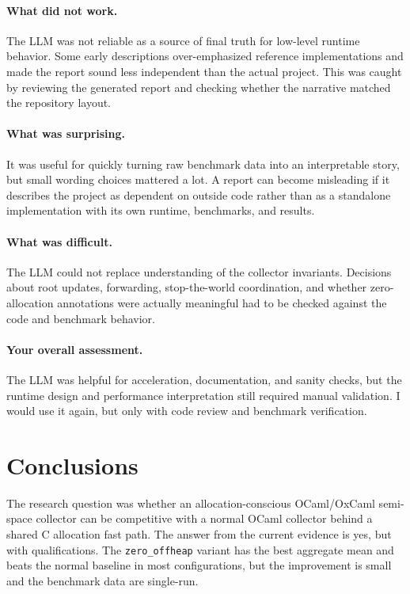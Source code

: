 \documentclass[11pt,a4paper]{article}
\begin{document}
\paragraph{What did not work.}
The LLM was not reliable as a source of final truth for low-level runtime
behavior. Some early descriptions over-emphasized reference implementations and
made the report sound less independent than the actual project. This was caught
by reviewing the generated report and checking whether the narrative matched
the repository layout.

\paragraph{What was surprising.}
It was useful for quickly turning raw benchmark data into an interpretable
story, but small wording choices mattered a lot. A report can become misleading
if it describes the project as dependent on outside code rather than as a
standalone implementation with its own runtime, benchmarks, and results.

\paragraph{What was difficult.}
The LLM could not replace understanding of the collector invariants. Decisions
about root updates, forwarding, stop-the-world coordination, and whether
zero-allocation annotations were actually meaningful had to be checked against
the code and benchmark behavior.

\paragraph{Your overall assessment.}
The LLM was helpful for acceleration, documentation, and sanity checks, but the
runtime design and performance interpretation still required manual validation.
I would use it again, but only with code review and benchmark verification.

\section{Conclusions}
\label{sec:conclusions}

The research question was whether an allocation-conscious OCaml/OxCaml
semi-space collector can be competitive with a normal OCaml collector behind a
shared C allocation fast path. The answer from the current evidence is yes, but
with qualifications. The \texttt{zero\_offheap} variant has the best aggregate
mean and beats the normal baseline in most configurations, but the improvement
is small and the benchmark data are single-run.
\end{document}
